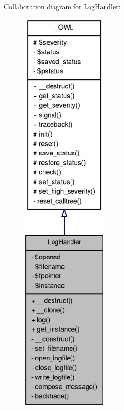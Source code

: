 Collaboration diagram for LogHandler:\nopagebreak
\begin{figure}[H]
\begin{center}
\leavevmode
\includegraphics[height=600pt]{classLogHandler__coll__graph}
\end{center}
\end{figure}
